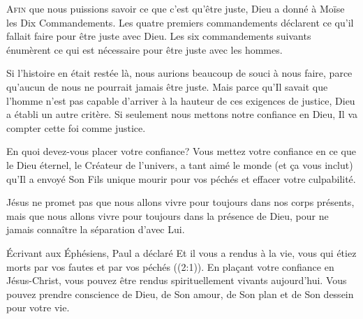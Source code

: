 



\lettrine{A}{fin} que nous puissions savoir ce que c'est qu'être juste,
 Dieu a donné à Moïse les Dix Commandements.
 Les quatre premiers commandements déclarent ce qu'il fallait faire
 pour être juste avec Dieu.
 Les six commandements suivants énumèrent ce qui est nécessaire
 pour être juste avec les hommes. 

Si l'histoire en était restée là, nous aurions beaucoup de souci à nous faire,
 parce qu'aucun de nous ne pourrait jamais être juste.
 Mais parce qu'Il savait que l'homme n'est pas capable d'arriver
 à la hauteur de ces exigences de justice, Dieu a établi un autre critère.
 Si seulement nous mettons notre confiance en Dieu,
 Il va compter cette foi comme justice. 

En quoi devez-vous placer votre confiance?
 Vous mettez votre confiance en ce que le Dieu éternel,
 le Créateur de l'univers, a tant aimé le monde (et \c{c}a vous inclut)
 qu'Il a envoyé Son Fils unique mourir pour vos péchés
 et effacer votre culpabilité. 


Jésus ne promet pas que nous allons vivre pour toujours
 dans nos corps présents, mais que nous allons vivre pour toujours
 dans la présence de Dieu, 
 pour ne jamais connaître la séparation d'avec Lui. 

Écrivant aux Éphésiens, Paul a déclaré\frcolon{}
 \Og Et il vous a rendus à la vie, vous qui étiez morts par vos fautes
 et par vos péchés \Fg{} ((2:1)).
 En pla\c{c}ant votre confiance en Jésus-Christ, vous pouvez être rendus
 spirituellement vivants aujourd'hui.
 Vous pouvez prendre conscience de Dieu, de Son amour, de Son plan
 et de Son dessein pour votre vie. 

\dvrule



